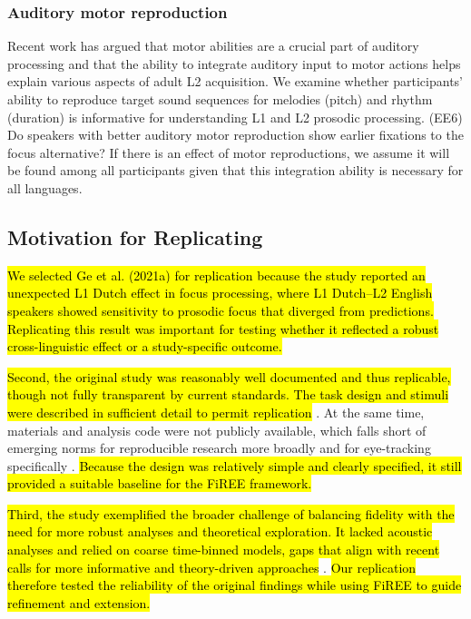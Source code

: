 \subsubsection{Auditory motor reproduction}
Recent work \parencite{tierney2014auditory, saito2024auditory,tierney2017individual} has argued that motor abilities are a crucial part of auditory processing and that the ability to integrate auditory input to motor actions helps explain various aspects of adult L2 acquisition. We examine whether participants' ability to reproduce target sound sequences for melodies (pitch) and rhythm (duration) is informative for understanding L1 and L2 prosodic processing. (EE6) Do speakers with better auditory motor reproduction show earlier fixations to the focus alternative? If there is an effect of motor reproductions, we assume it will be found among all participants given that this integration ability is necessary for all languages.

\subsection{Motivation for Replicating \textcite{ge2021a}}

\hl{We selected Ge et al. (2021a) for replication because the study reported an unexpected L1 Dutch effect in focus processing, where L1 Dutch–L2 English speakers showed sensitivity to prosodic focus that diverged from predictions. Replicating this result was important for testing whether it reflected a robust cross-linguistic effect or a study-specific outcome.}

\hl{Second, the original study was reasonably well documented and thus replicable, though not fully transparent by current standards. The task design and stimuli were described in sufficient detail to permit replication} \parencite{mcmanus2024}. At the same time, materials and analysis code were not publicly available, which falls short of emerging norms for reproducible research more broadly \parencite{goodman2016reproducibility} and for eye-tracking specifically \parencite{godfroid2025reporting,AOW}. \hl{Because the design was relatively simple and clearly specified, it still provided a suitable baseline for the 
FiREE framework.} 

\hl{Third, the study exemplified the broader challenge of balancing fidelity with the need for more robust analyses and theoretical exploration. It lacked 
acoustic analyses and relied on coarse time-binned models, gaps that align with recent calls for more informative and theory-driven approaches} \parencite{xie2023adaptive}. \hl{Our replication therefore tested the reliability of the 
original findings while using FiREE to guide refinement and extension.}

